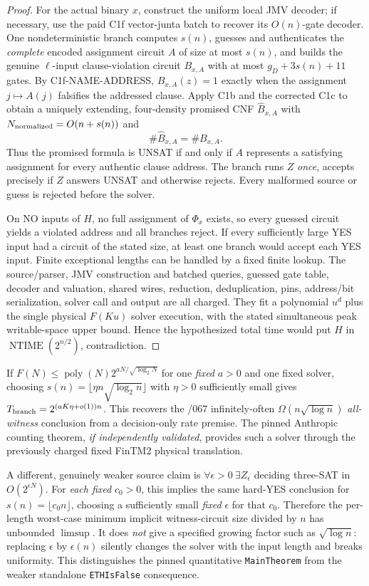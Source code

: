 \documentclass[11pt]{article}
\begin{document}
\begin{proof}
For the actual binary $x$, construct the uniform local JMV decoder;
if necessary, use the paid C1f vector-junta batch to recover its
$O(n)$-gate decoder. One nondeterministic branch computes $s(n)$,
guesses and authenticates the \emph{complete} encoded assignment
circuit $A$ of size at most $s(n)$, and builds the genuine
$\ell$-input clause-violation circuit
$B_{x,A}$ with at most $g_D+3s(n)+11$ gates.
By C1f-NAME-ADDRESS, $B_{x,A}(z)=1$ exactly when the
assignment $j\mapsto A(j)$ falsifies the addressed clause.
Apply C1b and the corrected C1c to obtain a uniquely extending,
four-density promised CNF $\widehat B_{x,A}$ with
$N_{\rm normalized}=O(n+s(n))$ and
\[
\#\widehat B_{x,A}=\#B_{x,A}.
\]
Thus the promised formula is UNSAT if and only if $A$
represents a satisfying assignment for every authentic clause
address. The branch runs $Z$ \emph{once}, accepts precisely
if $Z$ answers UNSAT and otherwise rejects. Every malformed
source or guess is rejected before the solver.

On NO inputs of $H$, no full assignment of $\Phi_x$ exists,
so every guessed circuit yields a violated address and all
branches reject. If every sufficiently large YES input had
a circuit of the stated size, at least one branch would
accept each YES input. Finite exceptional lengths can be
handled by a fixed finite lookup. The source/parser, JMV
construction and batched queries, guessed gate table, decoder
and valuation, shared wires, reduction, deduplication, pins,
address/bit serialization, solver call and output are all
charged. They fit a polynomial $u^d$ plus the single
physical $F(Ku)$ solver execution, with the stated simultaneous
peak writable-space upper bound. Hence the hypothesized
total time would put $H$ in
$\operatorname{NTIME}(2^{n/2})$, contradiction.
\end{proof}

If $F(N)\le\operatorname{poly}(N)
2^{aN/\sqrt{\log_2N}}$ for one \emph{fixed} $a>0$ and
one fixed solver, choosing
$s(n)=\lfloor\eta n\sqrt{\log_2n}\rfloor$
with $\eta>0$ sufficiently small gives
$T_{\rm branch}=2^{(aK\eta+o(1))n}$.
This recovers the /067 infinitely-often
$\Omega(n\sqrt{\log n})$ \emph{all-witness} conclusion
from a decision-only rate premise. The pinned Anthropic
counting theorem, \emph{if independently validated},
provides such a solver through the previously charged
fixed FinTM2 physical translation.

A different, genuinely weaker source claim is
$\forall\epsilon>0\ \exists Z_\epsilon$ deciding three-SAT
in $O(2^{\epsilon N})$. For \emph{each fixed}
$c_0>0$, this implies the same hard-YES conclusion
for $s(n)=\lfloor c_0n\rfloor$, choosing a sufficiently
small \emph{fixed} $\epsilon$ for that $c_0$.
Therefore the per-length worst-case minimum implicit
witness-circuit size divided by $n$ has unbounded
$\limsup$. It does \emph{not} give a specified growing
factor such as $\sqrt{\log n}$: replacing
$\epsilon$ by $\epsilon(n)$ silently changes the solver
with the input length and breaks uniformity.
This distinguishes the pinned quantitative
\texttt{MainTheorem} from the weaker standalone
\texttt{ETHIsFalse} consequence.
\end{document}
